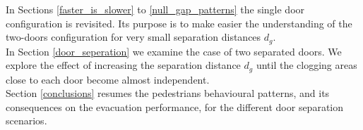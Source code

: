 In Sections \ref{faster_is_slower} to \ref{null_gap_patterns} the single door 
configuration is revisited. Its purpose is to make easier the understanding of 
the two-doors configuration for very small separation distances $d_g$. \\

In Section \ref{door_seperation} we examine the case of two separated doors. 
We explore the effect of increasing the separation distance $d_g$ until the 
clogging areas close to each door become almost independent. \\

Section \ref{conclusions} resumes the pedestrians behavioural patterns, and its 
consequences on the evacuation performance, for the different door 
separation scenarios. \\  


